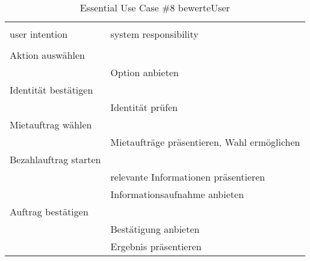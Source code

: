 \begin{table}[H]
\caption{Essential Use Case \#8 bewerteUser }
\centering
\begin{tabular}{l l}
\\ [-0.5ex]

\hline\hline
\\ [-0.5ex]
user intention & system responsibility
\\ [1.5ex]
\hline
\\ [-0.5ex]
Aktion auswählen	 		& 											 \\[1ex]
							& Option anbieten							 \\[1ex]
Identität bestätigen		& 											 \\[1ex]
							& Identität prüfen							 \\[1ex]
Mietauftrag wählen		  	& 											 \\[1ex] 
							& Mietaufträge präsentieren, Wahl ermöglichen\\[1ex]
Bezahlauftrag starten		& 											 \\[1ex]
							& relevante Informationen präsentieren		 \\[1ex]
							& Informationsaufnahme anbieten	     		 \\[1ex]
Auftrag bestätigen			&	     									 \\[1ex]
							& Bestätigung anbieten				   		 \\[1ex]
							& Ergebnis präsentieren			    		 \\[1ex]

\hline
\end{tabular}
\label{tab:statuscodes}
\end{table}

